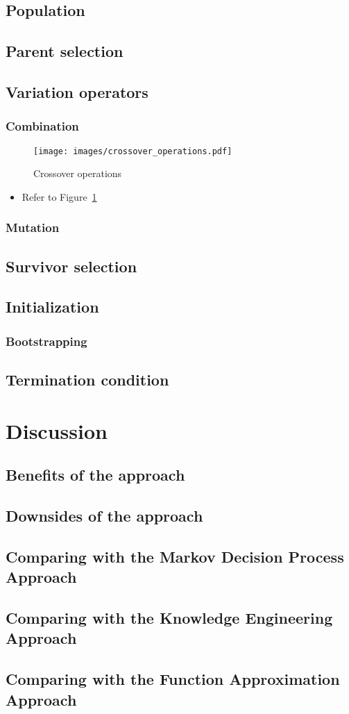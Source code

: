 \subsection{Population}
\subsection{Parent selection}
\subsection{Variation operators}
\subsubsection{Combination}
\begin{figure}[ht!]
	\centering
	\texttt{[image: images/crossover\_operations.pdf]}
	\caption[Crossover operations]{Crossover operations}
	\label{fig:crossover_operations}
\end{figure}
\begin{itemize}
	\item Refer to Figure~\ref{fig:crossover_operations}
\end{itemize}
\subsubsection{Mutation}
\subsection{Survivor selection}
\subsection{Initialization}
\subsubsection{Bootstrapping}
\subsection{Termination condition}
\section{Discussion}
\subsection{Benefits of the approach}
\subsection{Downsides of the approach}
\subsection{Comparing with the Markov Decision Process Approach}
\subsection{Comparing with the Knowledge Engineering Approach}
\subsection{Comparing with the Function Approximation Approach}
